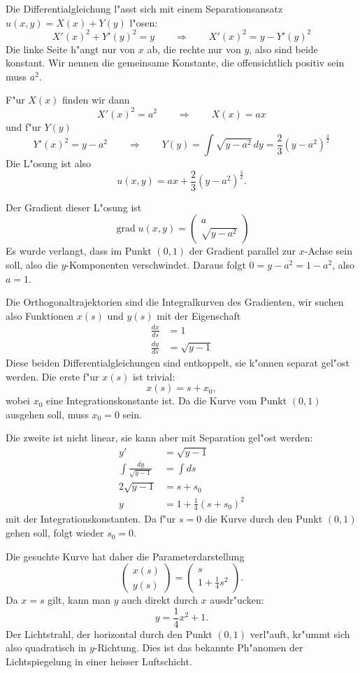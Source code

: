 \begin{loesung}
Die Differentialgleichung  l"asst sich mit einem Separationsansatz
$u(x,y)=X(x)+Y(y)$
l"osen:
\[
X'(x)^2+Y'(y)^2=y
\qquad
\Rightarrow
\qquad
X'(x)^2=y-Y'(y)^2
\]
Die linke Seite h"angt nur von $x$ ab, die rechte nur von $y$, also
sind beide konstant.
Wir nennen die gemeinsame Konstante, die offensichtlich positiv sein
muss $a^2$.

F"ur $X(x)$ finden wir dann
\[
X'(x)^2=a^2
\qquad\Rightarrow\qquad
X(x)=ax
\]
und f"ur $Y(y)$
\[
Y'(x)^2=y-a^2
\qquad\Rightarrow\qquad
Y(y)=\int \sqrt{y-a^2}\,dy=\frac23(y-a^2)^{\frac32}
\]
Die L"osung ist also
\[
u(x,y)=ax + \frac23(y-a^2)^{\frac32}.
\]

Der Gradient dieser L"osung ist
\[
\operatorname{grad}u(x,y)=\begin{pmatrix}a\\\sqrt{y-a^2}\end{pmatrix}
\]
Es wurde verlangt, dass im Punkt $(0,1)$ der Gradient parallel zur
$x$-Achse sein soll, also die $y$-Komponenten verschwindet. Daraus
folgt $0=y-a^2=1-a^2$, also $a=1$.

Die Orthogonaltrajektorien sind die Integralkurven des Gradienten,
wir suchen also Funktionen $x(s)$ und $y(s)$ mit der Eigenschaft
\begin{align*}
\frac{dx}{ds}&=1\\
\frac{dy}{ds}&=\sqrt{y-1}
\end{align*}
Diese beiden Differentialgleichungen sind entkoppelt, sie k"onnen
separat gel"ost werden. Die erste f"ur $x(s)$ ist trivial:
\[
x(s)=s + x_0,
\]
wobei $x_0$ eine Integrationskonstante ist.
Da die Kurve vom Punkt $(0,1)$ ausgehen soll, muss $x_0=0$ sein.

Die zweite ist nicht linear, sie kann aber mit Separation gel"ost
werden:
\begin{align*}
y'&=\sqrt{y-1}
\\
\int \frac{dy}{\sqrt{y-1}}&=\int ds
\\
2\sqrt{y-1}&=s+s_0
\\
y&=1+\frac14(s+s_0)^2
\end{align*}
mit der Integrationskonstanten.
Da f"ur $s=0$ die Kurve durch den Punkt $(0,1)$ gehen soll, folgt
wieder $s_0=0$.

Die gesuchte Kurve hat daher die Parameterdarstellung
\[
\begin{pmatrix}
x(s)\\y(s)
\end{pmatrix}
=
\begin{pmatrix}
s\\
1+\frac14s^2
\end{pmatrix}.
\]
Da $x=s$ gilt, kann man $y$ auch direkt durch $x$ ausdr"ucken:
\[
y=\frac14x^2+1.
\]
Der Lichtstrahl, der horizontal durch den Punkt $(0,1)$ verl"auft,
kr"ummt sich also quadratisch in $y$-Richtung.
Dies ist das bekannte Ph"anomen der Lichtspiegelung in einer
heisser Luftschicht.
\end{loesung}

